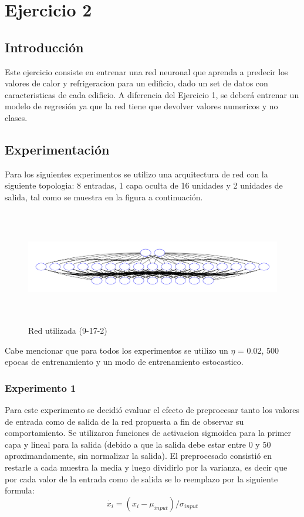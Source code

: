 \section{Ejercicio 2}

\subsection{Introducción}
Este ejercicio consiste en entrenar una red neuronal que aprenda a predecir los valores de calor y refrigeracion para un edificio, dado un set de datos
con caracteristicas de cada edificio. A diferencia del Ejercicio 1, se deberá entrenar un modelo de regresión ya que la red tiene que devolver valores
numericos y no clases.

\subsection{Experimentación}
Para los siguientes experimentos se utilizo una arquitectura de red con la siguiente topologia: 8 entradas, 1 capa oculta de 16 unidades y 2 unidades de salida,
tal como se muestra en la figura a continuación.

\begin{figure}[H]
  \includegraphics[width=12cm, height=5cm]{../plot/9-17-2.pdf}
  \centering
  \caption{Red utilizada (9-17-2)}
\end{figure}

Cabe mencionar que para todos los experimentos se utilizo un $\eta$ = 0.02, 500 epocas de entrenamiento y un modo de entrenamiento estocastico.
\subsubsection{Experimento 1}
Para este experimento se decidió evaluar el efecto de preprocesar tanto los valores de entrada como de salida de la red propuesta a fin de observar su
comportamiento. Se utilizaron funciones de activacion sigmoidea para la primer capa y lineal para la salida (debido a que la salida debe estar entre 0 y 50 aproximandamente,
 sin normalizar la salida). El preprocesado consistió en restarle a cada muestra la media y luego dividirlo por la varianza, es decir que por cada valor de la entrada
como de salida se lo reemplazo por la siguiente formula:
\begin{equation}
  \dot{x_{i}} = (x_{i} - \mu_{input}) / \sigma_{input}
\end{equation}

